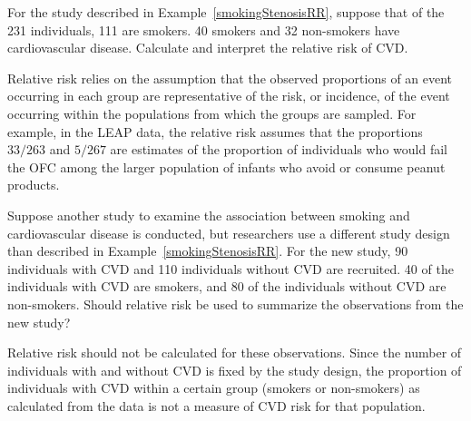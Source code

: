 \begin{exercisewrap}
\begin{nexercise}
For the study described in Example~\ref{smokingStenosisRR}, suppose that of the 231 individuals, 111 are smokers. 40 smokers and 32 non-smokers have cardiovascular disease. Calculate and interpret the relative risk of CVD.\footnotemark{}
\end{nexercise}
\end{exercisewrap}

Relative risk relies on the assumption that the observed proportions of an event occurring in each group are representative of the risk, or incidence, of the event occurring within the populations from which the groups are sampled. For example, in the LEAP data, the relative risk assumes that the proportions $33/263$ and $5/267$ are estimates of the proportion of individuals who would fail the OFC among the larger population of infants who avoid or consume peanut products. 


\begin{examplewrap}
\begin{nexample}{Suppose another study to examine the association between smoking and cardiovascular disease is conducted, but researchers use a different study design than described in Example~\ref{smokingStenosisRR}. For the new study, 90 individuals with CVD and 110 individuals without CVD are recruited. 40 of the individuals with CVD are smokers, and 80 of the individuals without CVD are non-smokers. Should relative risk be used to summarize the observations from the new study?}
	
Relative risk should not be calculated for these observations. Since the number of individuals with and without CVD is fixed by the study design, the proportion of individuals with CVD within a certain group (smokers or non-smokers) as calculated from the data is not a measure of CVD risk for that population.
\end{nexample}
\end{examplewrap}

\textD{\newpage}

